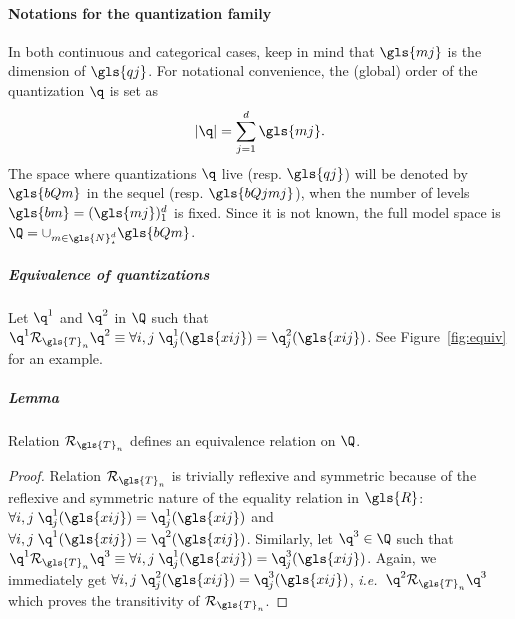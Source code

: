 \paragraph{Notations for the quantization family}

In both continuous and categorical cases, keep in mind that $\gls{mj}$ is the dimension of $\gls{qj}$. For notational convenience, the (global) order of the quantization $\q$ is set as 
\[|\q|=\sum_{j=1}^d \gls{mj}.\]
The space where quantizations $\q$ live (resp. $\gls{qj}$) will be denoted by $\gls{bQm}$ in the sequel (resp. $\gls{bQjmj}$), when the number of levels $\gls{bm} = (\gls{mj})_1^d$ is fixed. Since it is not known, the full model space is $\Q = \cup_{m \in \gls{N}_\star^{d}} \gls{bQm}$.

\subparagraph{Equivalence of quantizations} \label{par:equiv}

Let $\q^1$ and $\q^2$ in $\Q$ such that $\q^1 \mathcal{R}_{\gls{T}_n} \q^2 \equiv \forall i,j \; \q^1_j(\gls{xij}) = \q^2_j(\gls{xij})$. See Figure~\ref{fig:equiv} for an example.

\subparagraph{Lemma} Relation $\mathcal{R}_{\gls{T}_n}$ defines an equivalence relation on $\Q$.

\begin{proof}
Relation $\mathcal{R}_{\gls{T}_n}$ is trivially reflexive and symmetric because of the reflexive and symmetric nature of the equality relation in $\gls{R}$: $\forall i,j \; \q^1_j(\gls{xij}) = \q^1_j(\gls{xij})$ and $\forall i,j \; \q^1(\gls{xij}) = \q^2(\gls{xij})$. Similarly, let $\q^3 \in \Q$ such that $\q^1 \mathcal{R}_{\gls{T}_n} \q^3  \equiv \forall i,j \; \q^1_j(\gls{xij}) = \q^3_j(\gls{xij})$. Again, we immediately get $\forall i,j \; \q^2_j(\gls{xij}) = \q^3_j(\gls{xij})$, \textit{i.e.}\ $\q^2 \mathcal{R}_{\gls{T}_n} \q^3$ which proves the transitivity of $\mathcal{R}_{\gls{T}_n}$.
\end{proof}

